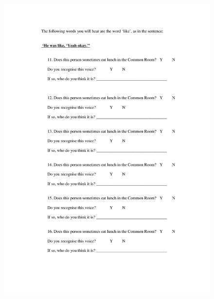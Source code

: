 \begin{figure}
	\centering
		\includegraphics[width=5in]{images/Exp3page3.pdf}
		\label{x3p3}
\end{figure}

